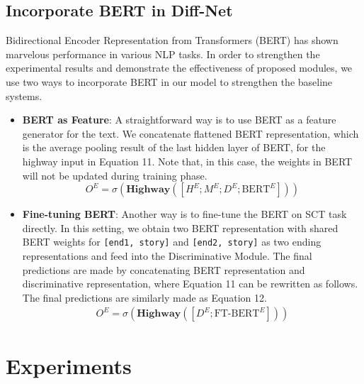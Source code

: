 \documentclass[letterpaper]{article} %
\begin{document}
\subsection{Incorporate BERT in Diff-Net}
Bidirectional Encoder Representation from Transformers (BERT) \cite{devlin2018bert} has shown marvelous performance in various NLP tasks. 
In order to strengthen the experimental results and demonstrate the effectiveness of proposed modules, we use two ways to incorporate BERT in our model to strengthen the baseline systems.
\begin{itemize}[leftmargin=*]
	\item {\bf BERT as Feature}: A straightforward way is to use BERT as a feature generator for the text. We concatenate flattened BERT representation, which is the average pooling result of the last hidden layer of BERT, for the highway input in Equation 11. Note that, in this case, the weights in BERT will not be updated during training phase.
	\begin{equation}
	O^E =  \sigma(\mathbf{Highway}([H^E; M^E; D^E; \text{BERT}^E]))
	\end{equation}
	\item {\bf Fine-tuning BERT}: Another way is to fine-tune the BERT on SCT task directly. In this setting, we obtain two BERT representation with shared BERT weights for {\tt[end1, story]} and {\tt[end2, story]} as two ending representations and feed into the Discriminative Module. The final predictions are made by concatenating BERT representation and discriminative representation, where Equation 11 can be rewritten as follows. 
	The final predictions are similarly made as Equation 12.
	\begin{gather}
	O^E =  \sigma(\mathbf{Highway}([D^E; \text{FT-BERT}^E]))
	\end{gather}
\end{itemize}


\section{Experiments}\label{experiments}        
\end{document}
